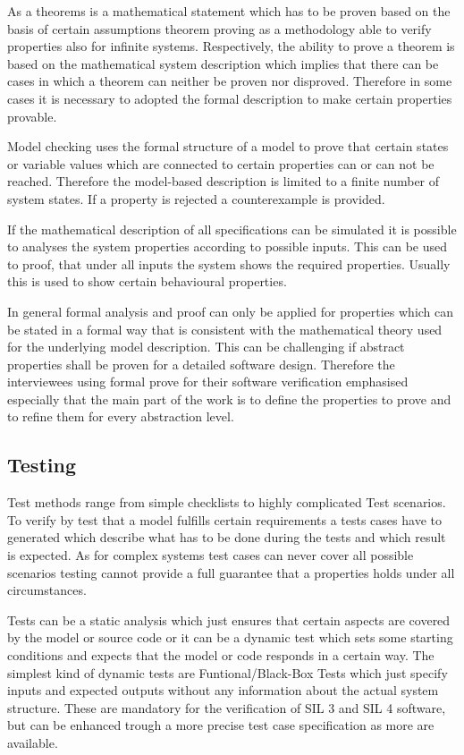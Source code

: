 \documentclass{./template/openetcs_report}
\begin{document}
As a theorems is a mathematical statement which has to be proven based on the basis of certain assumptions theorem proving as a methodology able to verify properties also for infinite systems. Respectively, the ability to prove a theorem is based on the mathematical system description which implies that there can be cases in which a theorem can neither be proven nor disproved. Therefore in some cases it is necessary to adopted the formal description to make certain properties provable.

Model checking uses the formal structure of a model to prove that certain states or variable values which are connected to certain properties can or can not be reached. Therefore the model-based description is limited to a finite number of system states. If a property is rejected a counterexample is provided.

If the mathematical description of all specifications can be simulated it is possible to analyses the system properties according to possible inputs. This can be used to proof, that under all inputs the system shows the required properties. Usually this is used to show certain behavioural properties.

In general  formal analysis and proof can only be applied for properties which can be stated in a formal way that is consistent with the mathematical theory used for the underlying model description. This can be challenging if abstract properties shall be proven for a detailed software design. Therefore the interviewees using formal prove for their software verification emphasised especially that the main part of the work is to define the properties to prove and to refine them for every abstraction level.

\subsection{Testing}

Test methods range from simple checklists to highly complicated Test scenarios. To verify by test that a model fulfills certain requirements a tests cases have to generated which describe what has to be done during the tests and which result is expected. As for complex systems test cases can never cover all possible scenarios testing cannot provide a full guarantee that a properties holds under all circumstances.

Tests can be a static analysis which just ensures that certain aspects are covered by the model or source code or it can be a dynamic test which sets some starting conditions and expects that the model or code  responds in a certain way. The simplest kind of dynamic tests are Funtional/Black-Box Tests which just specify inputs and expected outputs without any information about the  actual system structure. These are mandatory for the verification of SIL 3 and SIL 4 software, but can be enhanced trough a more precise test case specification as more are available.
\end{document}

